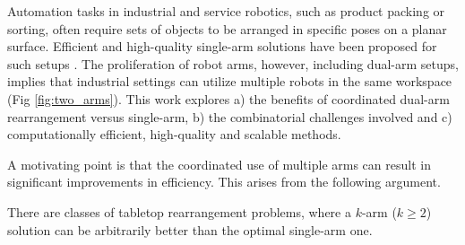 
Automation tasks in industrial and service robotics, such as product packing or sorting, often require sets of objects to be arranged in
specific poses on a planar surface. Efficient and high-quality
single-arm solutions have been proposed for such
setups \cite{193}. The proliferation of robot arms, however, including dual-arm setups, implies that industrial settings can utilize multiple robots in the same workspace (Fig \ref{fig:two_arms}). This work explores a) the benefits of coordinated dual-arm rearrangement versus single-arm, b) the combinatorial challenges involved and c) computationally efficient, high-quality and scalable methods.

 


A motivating point is that the coordinated use of multiple arms can
result in significant improvements in efficiency. This arises from the following argument.

\begin{lemma}\label{l:k-arm-lower-bound}
There are classes of tabletop rearrangement problems, where a $k$-arm
($k \ge 2$) solution can be arbitrarily better than the optimal
single-arm one.
\end{lemma}

